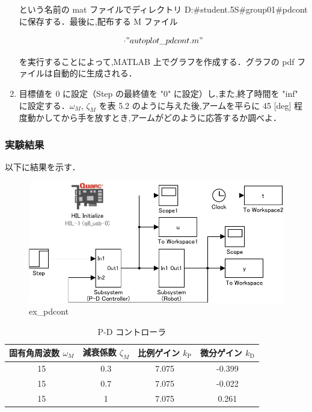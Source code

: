 \begin{enumerate}
        という名前の mat ファイルでディレクトリ D:\#student.5S\#group01\#pdcont に保存する．最後に,配布する M ファイル
        
        \begin{equation}
          \cdot "autoplot\_pdcont.m"
        \end{equation}
        
        を実行することによって,MATLAB 上でグラフを作成する．グラフの pdf ファイルは自動的に生成される．
        
  \item 目標値を 0 に設定（Step の最終値を "0" に設定）し,また,終了時間を "inf" に設定する．$\omega_M$, $\zeta_M$ を表 5.2 のように与えた後,アームを平らに 45 [deg] 程度動かしてから手を放すとき,アームがどのように応答するか調べよ．
\end{enumerate}


\subsubsection{実験結果}
以下に結果を示す．

\begin{figure}[h]
  \centering
  \includegraphics[scale=1]{sozai/ex_pdcont-crop.pdf}
  \caption{ex\_pdcont}
\end{figure}

\begin{table}[h]
  \centering
  \caption{P-D コントローラ}
  \begin{tabular}{|c|c|c|c|}
    \hline
    固有角周波数 $\omega_M$ & 減衰係数 $\zeta_M$ & 比例ゲイン $k_{\mathrm{P}}$ & 微分ゲイン $k_{\mathrm{D}}$ \\
    \hline
    15                      & 0.3                & 7.075                       & -0.399                      \\
    15                      & 0.7                & 7.075                       & -0.022                      \\
    15                      & 1                  & 7.075                       & 0.261                       \\
    \hline
  \end{tabular}
\end{table}

